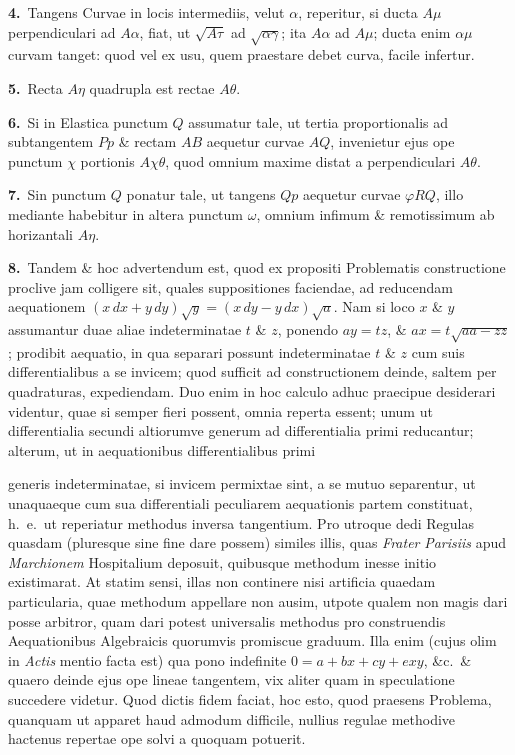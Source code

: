 \documentclass{article}
\begin{document}
\textbf{4.}~Tangens Curvae in locis intermediis, velut $\alpha$, reperitur, si ducta $A\mu$
perpendiculari ad $A\alpha$, fiat, ut $\sqrt{A\tau}$ ad $\sqrt{\alpha\gamma}$; ita $A\alpha$ ad
$A\mu$; ducta enim $\alpha\mu$ curvam tanget: quod vel ex usu, quem praestare debet curva, facile
infertur.

\textbf{5.}~Recta $A\eta$ quadrupla est rectae $A\theta$.

\textbf{6.}~Si in Elastica punctum $Q$ assumatur tale, ut tertia proportionalis ad subtangentem $Pp$
\& rectam $AB$ aequetur curvae $AQ$, invenietur ejus ope punctum $\chi$ portionis $A\chi\theta$, quod
omnium maxime distat a perpendiculari $A\theta$.

\textbf{7.}~Sin punctum $Q$ ponatur tale, ut tangens $Qp$ aequetur curvae $\varphi RQ$, illo mediante
habebitur in altera punctum $\omega$, omnium infimum \& remotissimum ab horizantali $A\eta$.

\textbf{8.}~Tandem \& hoc advertendum est, quod ex propositi Problematis constructione proclive jam
colligere sit, quales suppositiones faciendae, ad reducendam aequationem
$(x\,dx + y\,dy)\sqrt{y} = (x\,dy - y\,dx)\sqrt{a}$. Nam si loco $x$ \& $y$ assumantur duae aliae
indeterminatae $t$ \& $z$, ponendo $ay = tz$, \& $ax = t\sqrt{aa - zz}$; prodibit aequatio, in qua
separari possunt indeterminatae $t$ \& $z$ cum suis differentialibus a se invicem; quod sufficit ad
constructionem deinde, saltem per quadraturas, expediendam. Duo enim in hoc calculo adhuc praecipue
desiderari videntur, quae si semper fieri possent, omnia reperta essent; unum ut differentialia
secundi altiorumve generum ad differentialia primi reducantur; alterum, ut in aequationibus
differentialibus primi

generis indeterminatae, si invicem permixtae sint, a se mutuo separentur, ut unaquaeque cum sua
differentiali peculiarem aequationis partem constituat, h.\ e.\ ut reperiatur methodus inversa
tangentium. Pro utroque dedi Regulas quasdam (pluresque sine fine dare possem) similes illis, quas
\emph{Frater} \emph{Parisiis} apud \emph{Marchionem} Hospitalium deposuit, quibusque methodum inesse
initio existimarat. At statim sensi, illas non continere nisi artificia quaedam particularia, quae
methodum appellare non ausim, utpote qualem non magis dari posse arbitror, quam dari potest
universalis methodus pro construendis Aequationibus Algebraicis quorumvis promiscue graduum. Illa
enim (cujus olim in \emph{Actis} mentio facta est) qua pono indefinite $0 = a + bx + cy + exy$, \&c.\
\& quaero deinde ejus ope lineae tangentem, vix aliter quam in speculatione succedere videtur. Quod
dictis fidem faciat, hoc esto, quod praesens Problema, quanquam ut apparet haud admodum difficile,
nullius regulae methodive hactenus repertae ope solvi a quoquam potuerit.
\end{document}
